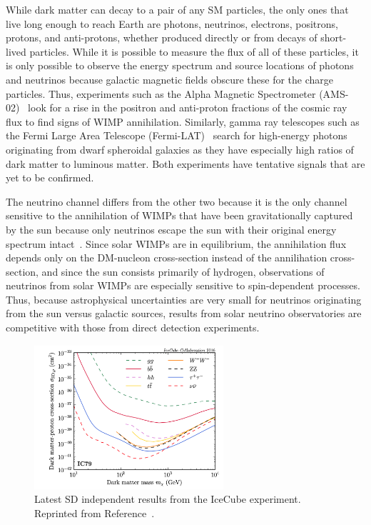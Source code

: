 While dark matter can decay to a pair of any SM particles, the only ones that live long enough to reach Earth are photons, neutrinos, electrons, positrons, protons, and anti-protons, whether produced directly or from decays of short-lived particles.
While it is possible to measure the flux of all of these particles, it is only possible to observe the energy spectrum and source locations of photons and neutrinos because galactic magnetic fields obscure these for the charge particles.
Thus, experiments such as the Alpha Magnetic Spectrometer (AMS-02)~\cite{AMS2014} look for a rise in the positron and anti-proton fractions of the cosmic ray flux to find signs of WIMP annihilation.
Similarly, gamma ray telescopes such as the Fermi Large Area Telescope (Fermi-LAT)~\cite{Fermi2015} search for high-energy photons originating from dwarf spheroidal galaxies as they have especially high ratios of dark matter to luminous matter.
Both experiments have tentative signals that are yet to be confirmed.

The neutrino channel differs from the other two because it is the only channel sensitive to the annihilation of WIMPs that have been gravitationally captured by the sun because only neutrinos escape the sun with their original energy spectrum intact~\cite{Gaskins2016}.
Since solar WIMPs are in equilibrium, the annihilation flux depends only on the DM-nucleon cross-section instead of the annilihation cross-section, and since the sun consists primarily of hydrogen, observations of neutrinos from solar WIMPs are especially sensitive to spin-dependent processes.
Thus, because astrophysical uncertainties are very small for neutrinos originating from the sun versus galactic sources, results from solar neutrino observatories are competitive with those from direct detection experiments.

\begin{figure}[htbp]
  \centering
  \includegraphics[width=0.625\textwidth]{DarkMatter/Figures/icecube.png}
  \caption{
    Latest SD independent results from the IceCube experiment.
    Reprinted from Reference~\cite{IceCube2016}.
  }
  \label{fig:dm_icecube}
\end{figure}

